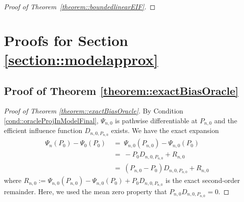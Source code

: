 \documentclass[11pt]{article}
\theoremstyle{definition}
\begin{document}
\begin{proof}[Proof of Theorem~\ref{theorem::boundedlinearEIF}]
 \end{proof}



\section{Proofs for Section \ref{section::modelapprox}}

\subsection{Proof of Theorem \ref{theorem::exactBiasOracle}}

\begin{proof}[Proof of Theorem \ref{theorem::exactBiasOracle}]
By Condition \ref{cond::oracleProjInModelFinal}, $\Psi_{n,0}$ is pathwise differentiable at $P_{n,0}$ and the efficient influence function $D_{n,0, P_{n,0}}$ exists. We have the exact expansion
\begin{align}
        \Psi_n(P_0) - \Psi_0(P_0)\ &=\
        \Psi_{n,0}(P_{n,0}) -\Psi_{n,0}(P_0) \nonumber\\
        &=\  -  P_0 D_{n, 0,P_{n,0}}  + R_{n,0}   \nonumber\\
        &=\  (P_{n,0} - P_0)  D_{n,0,P_{n,0}}  + R_{n,0}  \label{proof::eqn::exactBiasOracleExpansion}
\end{align}
where $R_{n,0}  := \Psi_{n,0}(P_{n,0}) - \Psi_{n,0}(P_0) + P_{0} D_{n,0,P_{n,0}}$ is the exact second-order remainder. Here, we used the mean zero property that $P_{n,0} D_{n,0,P_{n,0}} = 0$.



\end{proof}
\end{document}
